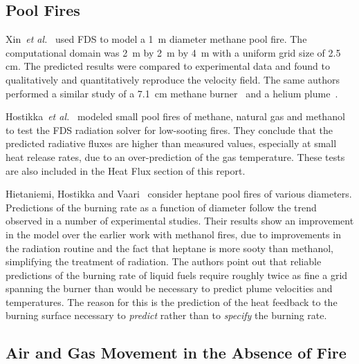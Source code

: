 \subsection{Pool Fires}


Xin~{\em et  al.}~\cite{Xin:JSS2005} used FDS to model  a 1~m diameter methane pool  fire.  The  computational domain was  2~m by 2~m  by 4~m with  a
uniform  grid  size of  2.5  cm.  The  predicted results  were compared  to   experimental  data  and  found   to  qualitatively  and quantitatively
reproduce   the  velocity  field.   The  same  authors performed a similar study of a 7.1~cm methane burner~\cite{Xin:CF2005} and a helium
plume~\cite{Xin:CS2002}.

Hostikka~{\em et al.}~\cite{Hostikka:3} modeled small pool fires of
methane, natural gas and methanol  to test the FDS radiation solver for low-sooting
fires.  They conclude that the predicted radiative fluxes are higher than measured values, especially at small heat
release rates, due to an over-prediction of the gas temperature. These
tests are also included in the Heat Flux section of this report.

Hietaniemi,  Hostikka and  Vaari~\cite{Hietaniemi:1}  consider heptane pool fires of various diameters.  Predictions of the burning rate as a
function  of  diameter  follow  the  trend observed  in  a  number  of experimental studies.  Their results show an improvement  in the model over
the earlier work with  methanol fires, due to improvements in the radiation  routine  and the  fact  that  heptane  is more  sooty  than methanol,
simplifying  the treatment of radiation.   The authors point out  that reliable  predictions of  the burning  rate of  liquid fuels require roughly
twice as fine a grid spanning the burner than would be necessary to predict plume velocities and temperatures. The reason for this is  the prediction
of the heat  feedback to the  burning surface necessary to {\em predict} rather  than to {\em specify} the burning rate.


\subsection{Air and Gas Movement in the Absence of Fire}

